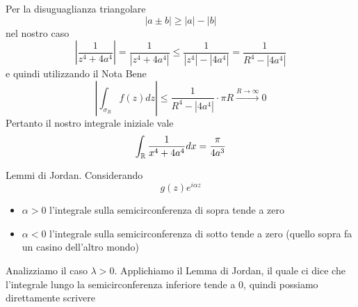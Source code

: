 Per la disuguaglianza triangolare
\begin{equation*}
\left| a\pm b\right| \geqslant \left| a\right| -\left| b\right| 
\end{equation*}
nel nostro caso
\begin{equation*}
\left| \frac{1}{z^{4} +4a^{4}}\right| =\frac{1}{\left| z^{4} +4a^{4}\right| } \leqslant \frac{1}{\left| z^{4}\right| -\left| 4a^{4}\right| } =\frac{1}{R^{4} -\left| 4a^{4}\right| }
\end{equation*}
e quindi utilizzando il Nota Bene
\begin{equation*}
\left| \int _{\sigma _{R}} f\left( z\right) dz\right| \leqslant \frac{1}{R^{4} -\left| 4a^{4}\right| } \cdotp \pi R\xrightarrow{R\rightarrow \infty } 0
\end{equation*}
Pertanto il nostro integrale iniziale vale
\begin{equation*}
\int _{\mathbb{R} }\frac{1}{x^{4} +4a^{4}} dx=\frac{\pi }{4a^{3}}
\end{equation*}
\Soluzione
\begin{thm}
Lemmi di Jordan. Considerando
\begin{equation*}
g\left( z\right) e^{i\alpha z}
\end{equation*}
\begin{itemize}
\item $\alpha  >0$ l'integrale sulla semicirconferenza di sopra tende a zero
\item $\alpha < 0$ l'integrale sulla semicirconferenza di sotto tende a zero (quello sopra fa un casino dell'altro mondo)
\end{itemize}
\end{thm}
Analizziamo il caso $\lambda  >0$. Applichiamo il Lemma di Jordan, il quale ci dice che l'integrale lungo la semicirconferenza inferiore tende a $0$, quindi possiamo direttamente scrivere


